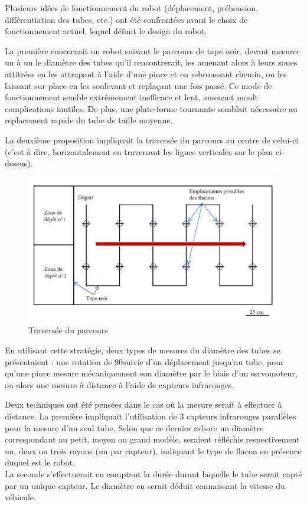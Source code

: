 \documentclass[a4paper,11pt]{article}
\begin{document}
Plusieurs idées de fonctionnement du robot (déplacement, préhension, différentiation des tubes, etc.) ont été confrontées avant le choix de fonctionnement actuel, lequel définit le design du robot.

La première concernait un robot suivant le parcours de tape noir, devant mesurer un à un le diamètre des tubes qu'il rencontrerait, les amenant alors à leurs zones attitrées en les attrapant à l'aide d'une pince et en rebroussant chemin, ou les laissant sur place en les soulevant et replaçant une fois passé. Ce mode de fonctionnement semble extrêmement inefficace et lent, amenant moult complications inutiles. De plus, une plate-forme tournante semblait nécessaire au replacement rapide du tube de taille moyenne.

La deuxième proposition impliquait la traversée du parcours au centre de celui-ci (c'est à dire, horizontalement en traversant les lignes verticales sur le plan ci-dessus).
\newline

\begin{figure}[H]
    \centering
    \includegraphics[scale = 0.4]{sens_parcours.PNG}
    \caption{Traversée du parcours}
\end{figure}

En utilisant cette stratégie, deux types de mesures du diamètre des tubes se présentaient : une rotation de 90\degree  suivie d'un déplacement jusqu'au tube, pour qu'une pince mesure mécaniquement son diamètre par le biais d'un servomoteur, ou alors une mesure à distance à l'aide de capteurs infrarouges.

Deux techniques ont été pensées dans le cas où la mesure serait à effectuer à distance. La première impliquait l'utilisation de 3 capteurs infrarouges parallèles pour la mesure d'un seul tube. Selon que ce dernier arbore un diamètre correspondant au petit, moyen ou grand modèle, seraient réfléchis respectivement un, deux ou trois rayons (un par capteur), indiquant le type de flacon en présence duquel est le robot.\\
La seconde s'effectuerait en comptant la durée durant laquelle le tube serait capté par un unique capteur. Le diamètre en serait déduit connaissant la vitesse du véhicule.\\
\end{document}
